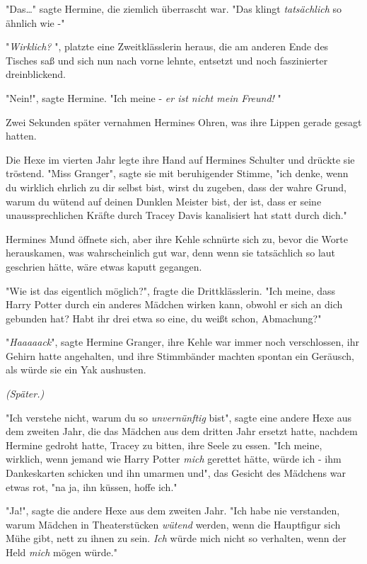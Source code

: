 {"Das…" sagte Hermine, die ziemlich überrascht war. "Das klingt \emph{tatsächlich} so ähnlich wie -"

"\emph{Wirklich?} ", platzte eine Zweitklässlerin heraus, die am anderen Ende des Tisches saß und sich nun nach vorne lehnte, entsetzt und noch faszinierter dreinblickend.

"Nein!", sagte Hermine. "Ich meine - \emph{er ist nicht mein Freund!} "

Zwei Sekunden später vernahmen Hermines Ohren, was ihre Lippen gerade gesagt hatten.

Die Hexe im vierten Jahr legte ihre Hand auf Hermines Schulter und drückte sie tröstend. "Miss Granger", sagte sie mit beruhigender Stimme, "ich denke, wenn du wirklich ehrlich zu dir selbst bist, wirst du zugeben, dass der wahre Grund, warum du wütend auf deinen Dunklen Meister bist, der ist, dass er seine unaussprechlichen Kräfte durch Tracey Davis kanalisiert hat statt durch dich."

Hermines Mund öffnete sich, aber ihre Kehle schnürte sich zu, bevor die Worte herauskamen, was wahrscheinlich gut war, denn wenn sie tatsächlich so laut geschrien hätte, wäre etwas kaputt gegangen.

"Wie ist das eigentlich möglich?", fragte die Drittklässlerin. "Ich meine, dass Harry Potter durch ein anderes Mädchen wirken kann, obwohl er sich an dich gebunden hat? Habt ihr drei etwa so eine, du weißt schon, Abmachung?"

"\emph{Haaaaack}", sagte Hermine Granger, ihre Kehle war immer noch verschlossen, ihr Gehirn hatte angehalten, und ihre Stimmbänder machten spontan ein Geräusch, als würde sie ein Yak aushusten.

\emph{(Später.)}

"Ich verstehe nicht, warum du so \emph{unvernünftig} bist", sagte eine andere Hexe aus dem zweiten Jahr, die das Mädchen aus dem dritten Jahr ersetzt hatte, nachdem Hermine gedroht hatte, Tracey zu bitten, ihre Seele zu essen. "Ich meine, wirklich, wenn jemand wie Harry Potter \emph{mich} gerettet hätte, würde ich - ihm Dankeskarten schicken und ihn umarmen und", das Gesicht des Mädchens war etwas rot, "na ja, ihn küssen, hoffe ich."

"Ja!", sagte die andere Hexe aus dem zweiten Jahr. "Ich habe nie verstanden, warum Mädchen in Theaterstücken \emph{wütend} werden, wenn die Hauptfigur sich Mühe gibt, nett zu ihnen zu sein. \emph{Ich} würde mich nicht so verhalten, wenn der Held \emph{mich} mögen würde."

}
